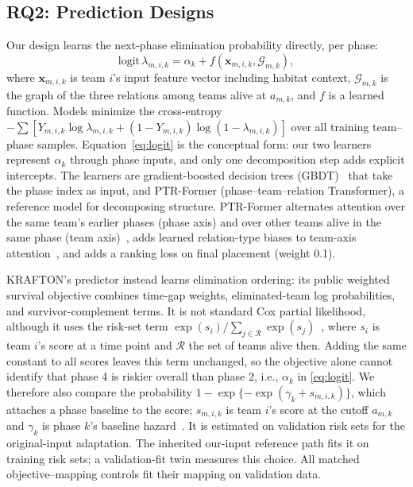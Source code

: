 \documentclass[sigconf,anonymous,nonacm]{acmart}
\begin{document}
\subsection{RQ2: Prediction Designs}
\label{sec:method:rq2}
Our design learns the next-phase elimination probability directly, per phase:
\begin{equation}
\mathrm{logit}\,\lambda_{m,i,k}=\alpha_k+f(\mathbf{x}_{m,i,k},\mathcal{G}_{m,k}),
\label{eq:logit}
\end{equation}
where $\mathbf{x}_{m,i,k}$ is team $i$'s input feature vector including habitat context, $\mathcal{G}_{m,k}$ is the graph of the three relations among teams alive at $a_{m,k}$, and $f$ is a learned function.
Models minimize the cross-entropy $-\sum[Y_{m,i,k}\log\lambda_{m,i,k}+(1-Y_{m,i,k})\log(1-\lambda_{m,i,k})]$ over all training team--phase samples.
Equation~\eqref{eq:logit} is the conceptual form: our two learners represent $\alpha_k$ through phase inputs, and only one decomposition step adds explicit intercepts. The learners are gradient-boosted decision trees (GBDT)~\cite{Friedman01} that take the phase index as input, and PTR-Former (phase--team--relation Transformer), a reference model for decomposing structure.
PTR-Former alternates attention over the same team's earlier phases (phase axis) and over other teams alive in the same phase (team axis)~\cite{Vaswani17}, adds learned relation-type biases to team-axis attention~\cite{Ying21}, and adds a ranking loss on final placement (weight 0.1).

KRAFTON's predictor instead learns elimination ordering: its public weighted survival objective combines time-gap weights, eliminated-team log probabilities, and survivor-complement terms. It is not standard Cox partial likelihood, although it uses the risk-set term $\exp(s_i)/\sum_{j\in\mathcal{R}}\exp(s_j)$~\cite{Cox72}, where $s_i$ is team $i$'s score at a time point and $\mathcal{R}$ the set of teams alive then.
Adding the same constant to all scores leaves this term unchanged, so the objective alone cannot identify that phase 4 is riskier overall than phase 2, i.e., $\alpha_k$ in \eqref{eq:logit}.
We therefore also compare the probability $1-\exp\{-\exp(\gamma_k+s_{m,i,k})\}$, which attaches a phase baseline to the score; $s_{m,i,k}$ is team $i$'s score at the cutoff $a_{m,k}$ and $\gamma_k$ is phase $k$'s baseline hazard~\cite{PrenticeGloeckler78}. It is estimated on validation risk sets for the original-input adaptation. The inherited our-input reference path fits it on training risk sets; a validation-fit twin measures this choice. All matched objective--mapping controls fit their mapping on validation data.
\end{document}

